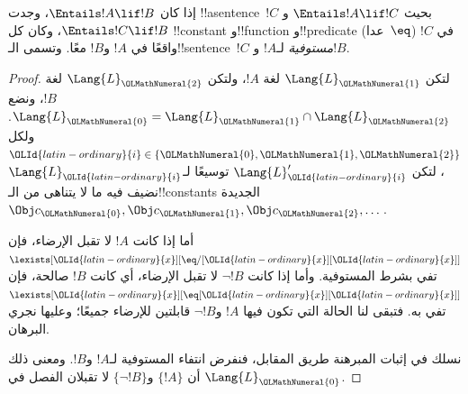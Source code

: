 \documentclass[../../../include/open-logic-section]{subfiles}
\begin{document}


\begin{thm}
إذا كان $\Entails !A \lif !B$، وجدت !!a{sentence}~$!C$ بحيث
$\Entails !A \lif !C$ و$\Entails !C \lif !B$، وكان كل !!{constant}
و!!{function} و!!{predicate} (عدا~$\eq$) في $!C$ واقعًا في $!A$ و$!B$
معًا. وتسمى الـ!!{sentence}~$!C$ \emph{مستوفية} لـ$!A$ و$!B$.
\end{thm}

\begin{proof}
لتكن $\Lang{L}_{\OLMathNumeral{1}}$ لغة $!A$، ولتكن $\Lang{L}_{\OLMathNumeral{2}}$ لغة $!B$، ونضع
$\Lang{L}_{\OLMathNumeral{0}} = \Lang{L}_{\OLMathNumeral{1}} \cap \Lang{L}_{\OLMathNumeral{2}}$. ولكل
${\OLId{latin-ordinary}{i}} \in \{{\OLMathNumeral{0}},{\OLMathNumeral{1}},{\OLMathNumeral{2}}\}$، لتكن $\Lang{L}'_{\OLId{latin-ordinary}{i}}$ توسيعًا لـ$\Lang{L}_{\OLId{latin-ordinary}{i}}$ نضيف فيه
ما لا يتناهى من الـ!!{constant}s الجديدة
$\Obj c_{\OLMathNumeral{0}}, \Obj c_{\OLMathNumeral{1}}, \Obj c_{\OLMathNumeral{2}}, \dots$.

أما إذا كانت $!A$ لا تقبل الإرضاء، فإن
$\lexists[{\OLId{latin-ordinary}{x}}][\eq/[{\OLId{latin-ordinary}{x}}][{\OLId{latin-ordinary}{x}}]]$ تفي بشرط المستوفية. وأما إذا كانت $\lnot !B$ لا تقبل
الإرضاء، أي كانت $!B$ صالحة، فإن
$\lexists[{\OLId{latin-ordinary}{x}}][\eq[{\OLId{latin-ordinary}{x}}][{\OLId{latin-ordinary}{x}}]]$ تفي به. فتبقى لنا الحالة التي تكون فيها $!A$
و$\lnot !B$ قابلتين للإرضاء جميعًا؛ وعليها نجري البرهان.

نسلك في إثبات المبرهنة طريق المقابل، فنفرض انتفاء المستوفية لـ$!A$
و$!B$. ومعنى ذلك أن $\{!A\}$ و$\{\lnot !B\}$ لا تقبلان
الفصل في $\Lang{L}_{\OLMathNumeral{0}}$.


\end{proof}
\end{document}
